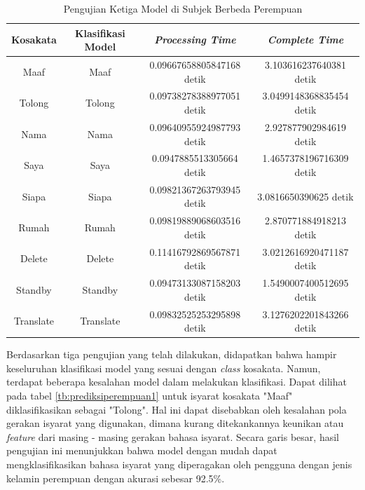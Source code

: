 \newpage
\begin{longtable}{|c|c|c|c|}
  \caption{Pengujian Ketiga Model di Subjek Berbeda Perempuan}
  \label{tb:prediksiperempuan3}                                   \\
  \hline
  \rowcolor[HTML]{C0C0C0}
  \textbf{Kosakata} & \textbf{Klasifikasi Model} & \textbf{\emph{Processing Time}} & \textbf{\emph{Complete Time}}\\
  \hline
  Maaf              & Maaf                        & 0.09667658805847168 detik                           & 3.103616237640381 detik                                 \\
  Tolong            & Tolong                      & 0.09738278388977051 detik                           & 3.0499148368835454 detik                                  \\
  Nama              & Nama                        & 0.09640955924987793 detik                           & 2.927877902984619 detik                                 \\
  Saya              & Saya                        & 0.0947885513305664 detik                            & 1.4657378196716309 detik                                  \\
  Siapa             & Siapa                       & 0.09821367263793945 detik                           & 3.0816650390625 detik                               \\
  Rumah             & Rumah                       & 0.09819889068603516 detik                           & 2.870771884918213 detik                                 \\
  Delete            & Delete                      & 0.11416792869567871 detik                           & 3.0212616920471187 detik                                  \\
  Standby           & Standby                     & 0.09473133087158203 detik                           & 1.5490007400512695 detik                                  \\
  Translate         & Translate                   & 0.09832525253295898 detik                           & 3.1276202201843266 detik                                  \\
  \hline
\end{longtable}

Berdasarkan tiga pengujian yang telah dilakukan, didapatkan bahwa hampir keseluruhan klasifikasi model yang sesuai dengan \emph{class} kosakata. Namun, terdapat beberapa kesalahan model dalam melakukan klasifikasi. Dapat dilihat pada tabel \ref{tb:prediksiperempuan1} untuk isyarat kosakata "Maaf" diklasifikasikan sebagai "Tolong". Hal ini dapat disebabkan oleh kesalahan pola gerakan isyarat yang digunakan, dimana kurang ditekankannya keunikan atau \emph{feature} dari masing - masing gerakan bahasa isyarat.  Secara garis besar, hasil pengujian ini menunjukkan bahwa model dengan mudah dapat mengklasifikasikan bahasa isyarat yang diperagakan oleh pengguna dengan jenis kelamin perempuan dengan akurasi sebesar 92.5\%. 

